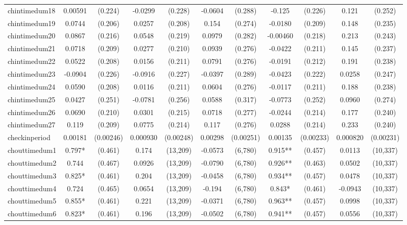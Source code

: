 \documentclass[]{article}
\begin{document}
\begin{tabular}{lcccccccccc}
chintimedum18 & 0.00591 & (0.224) & -0.0299 & (0.228) & -0.0604 & (0.288) & -0.125 & (0.226) & 0.121 & (0.252) \\
chintimedum19 & 0.0744 & (0.206) & 0.0257 & (0.208) & 0.154 & (0.274) & -0.0180 & (0.209) & 0.148 & (0.235) \\
chintimedum20 & 0.0867 & (0.216) & 0.0548 & (0.219) & 0.0979 & (0.282) & -0.00460 & (0.218) & 0.213 & (0.243) \\
chintimedum21 & 0.0718 & (0.209) & 0.0277 & (0.210) & 0.0939 & (0.276) & -0.0422 & (0.211) & 0.145 & (0.237) \\
chintimedum22 & 0.0522 & (0.208) & 0.0156 & (0.211) & 0.0791 & (0.276) & -0.0191 & (0.212) & 0.191 & (0.238) \\
chintimedum23 & -0.0904 & (0.226) & -0.0916 & (0.227) & -0.0397 & (0.289) & -0.0423 & (0.222) & 0.0258 & (0.247) \\
chintimedum24 & 0.0590 & (0.208) & 0.0116 & (0.211) & 0.0604 & (0.276) & -0.0117 & (0.211) & 0.188 & (0.238) \\
chintimedum25 & 0.0427 & (0.251) & -0.0781 & (0.256) & 0.0588 & (0.317) & -0.0773 & (0.252) & 0.0960 & (0.274) \\
chintimedum26 & 0.0690 & (0.210) & 0.0301 & (0.215) & 0.0718 & (0.277) & -0.0244 & (0.214) & 0.177 & (0.240) \\
chintimedum27 & 0.119 & (0.209) & 0.0775 & (0.214) & 0.117 & (0.276) & 0.0288 & (0.214) & 0.233 & (0.240) \\
checkinperiod & 0.00181 & (0.00246) & 0.000930 & (0.00248) & 0.00298 & (0.00251) & 0.00135 & (0.00233) & 0.000820 & (0.00231) \\
chouttimedum1 & 0.797* & (0.461) & 0.174 & (13,209) & -0.0573 & (6,780) & 0.915** & (0.457) & 0.0113 & (10,337) \\
chouttimedum2 & 0.744 & (0.467) & 0.0926 & (13,209) & -0.0790 & (6,780) & 0.926** & (0.463) & 0.0502 & (10,337) \\
chouttimedum3 & 0.825* & (0.461) & 0.204 & (13,209) & -0.0458 & (6,780) & 0.934** & (0.457) & 0.0478 & (10,337) \\
chouttimedum4 & 0.724 & (0.465) & 0.0654 & (13,209) & -0.194 & (6,780) & 0.843* & (0.461) & -0.0943 & (10,337) \\
chouttimedum5 & 0.855* & (0.461) & 0.221 & (13,209) & -0.0371 & (6,780) & 0.963** & (0.457) & 0.0998 & (10,337) \\
chouttimedum6 & 0.823* & (0.461) & 0.196 & (13,209) & -0.0502 & (6,780) & 0.941** & (0.457) & 0.0556 & (10,337) \\

\end{tabular}
\end{document}
